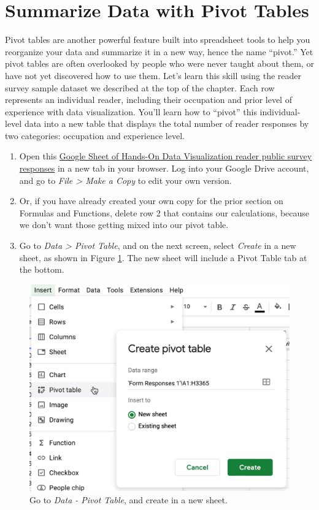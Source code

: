 \documentclass[
  english,
]{book}
\begin{document}
\hypertarget{pivot}{%
\section*{Summarize Data with Pivot Tables}\label{pivot}}

Pivot tables are another powerful feature built into spreadsheet tools to help you reorganize your data and summarize it in a new way, hence the name ``pivot.'' Yet pivot tables are often overlooked by people who were never taught about them, or have not yet discovered how to use them. Let's learn this skill using the reader survey sample dataset we described at the top of the chapter. Each row represents an individual reader, including their occupation and prior level of experience with data visualization. You'll learn how to ``pivot'' this individual-level data into a new table that displays the total number of reader responses by two categories: occupation and experience level.

\begin{enumerate}
\def\labelenumi{\arabic{enumi}.}
\item
  Open this \href{https://docs.google.com/spreadsheets/d/1egX_akJccnCSzdk1aaDdtrEGe5HcaTrlOW-Yf6mJ3Uo}{Google Sheet of Hands-On Data Visualization reader public survey responses} in a new tab in your browser. Log into your Google Drive account, and go to \emph{File \textgreater{} Make a Copy} to edit your own version.
\item
  Or, if you have already created your own copy for the prior section on Formulas and Functions, delete row 2 that contains our calculations, because we don't want those getting mixed into our pivot table.
\item
  Go to \emph{Data \textgreater{} Pivot Table}, and on the next screen, select \emph{Create} in a new sheet, as shown in Figure \ref{fig:sheets-pivot-create}. The new sheet will include a Pivot Table tab at the bottom.
\end{enumerate}



\begin{figure}
\includegraphics[width=450px]{images/02-spreadsheet/sheets-pivot-create} \caption{Go to \emph{Data - Pivot Table}, and create in a new sheet.}\label{fig:sheets-pivot-create}
\end{figure}
\end{document}
